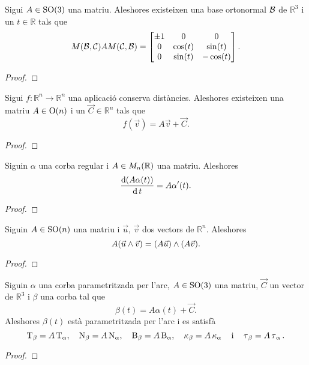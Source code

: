 \documentclass[../../Main.tex]{subfiles}
\begin{document}
	\begin{proposition}
		Sigui \(A\in\operatorname{SO}(3)\) una matriu. Aleshores existeixen una base ortonormal \(\mathcal{B}\) de \(\mathbb{R}^{3}\) i un \(t\in\mathbb{R}\) tals que
		\[M(\mathcal{B},\mathcal{C})AM(\mathcal{C},\mathcal{B})=\begin{bmatrix}
			\pm1 & 0 & 0 \\
			0 & \cos(t) & \sin(t) \\
			0 & \sin(t) & -\cos(t)
		\end{bmatrix}.\]
		\begin{proof}
		\end{proof}
	\end{proposition}
	\begin{proposition}
		\label{prop:forma matricial de les aplicacions que conserven distàncies}
		Sigui \(f\colon\mathbb{R}^{n}\longrightarrow\mathbb{R}^{n}\) una aplicació conserva distàncies. Aleshores existeixen una matriu \(A\in\operatorname{O}(n)\) i un \(\vec{C}\in\mathbb{R}^{n}\) tals que
		\[f(\vec{v})=A\vec{v}+\vec{C}.\]
		\begin{proof}
		\end{proof}
	\end{proposition}
	\begin{proposition}
		\label{prop:derivada del producte d'una matriu per una corba}
		Siguin \(\alpha\) una corba regular i \(A\in M_{n}(\mathbb{R})\) una matriu. Aleshores
		\[\frac{\operatorname{d}(A\alpha(t))}{\operatorname{d} t}=A\alpha'(t).\]
		\begin{proof}
		\end{proof}
	\end{proposition}
	\begin{proposition}
		\label{prop:les matrius especials ortogonals conserven el producte vectorial}
		Siguin \(A\in\operatorname{SO}(n)\) una matriu i \(\vec{u}\), \(\vec{v}\) dos vectors de \(\mathbb{R}^{n}\). Aleshores
		\[A(\vec{u}\mathbin{\wedge}\vec{v})=(A\vec{u})\mathbin{\wedge}(A\vec{v}).\]
		\begin{proof}
		\end{proof}
	\end{proposition}
	\begin{corollary}
		\label{cor:una corba parametritzada per l'arc i la seva imatge per una aplicació que conserva les distàncies són equivalents}
		Siguin \(\alpha\) una corba parametritzada per l'arc, \(A\in\operatorname{SO}(3)\) una matriu, \(\vec{C}\) un vector de \(\mathbb{R}^{3}\) i \(\beta\) una corba tal que
		\[\beta(t)=A\alpha(t)+\vec{C}.\]
		Aleshores \(\beta(t)\) està parametritzada per l'arc i es satisfà
		\[\operatorname{T}_{\beta}=A\operatorname{T}_{\alpha},\quad\operatorname{N}_{\beta}=A\operatorname{N}_{\alpha},\quad\operatorname{B}_{\beta}=A\operatorname{B}_{\alpha},\quad\operatorname{\kappa}_{\beta}=A\operatorname{\kappa}_{\alpha}\quad\text{i}\quad\operatorname{\tau}_{\beta}=A\operatorname{\tau}_{\alpha}.\]
		\begin{proof}
		\end{proof}
	\end{corollary}
\end{document}
